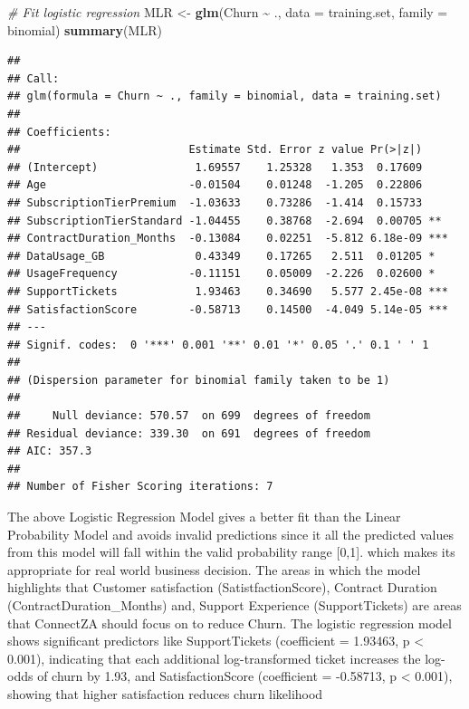 \documentclass[
]{article}
\newenvironment{Shaded}{\begin{snugshade}}{\end{snugshade}}
\newcommand{\AttributeTok}[1]{\textcolor[rgb]{0.13,0.29,0.53}{#1}}
\newcommand{\CommentTok}[1]{\textcolor[rgb]{0.56,0.35,0.01}{\textit{#1}}}
\newcommand{\FunctionTok}[1]{\textcolor[rgb]{0.13,0.29,0.53}{\textbf{#1}}}
\newcommand{\NormalTok}[1]{#1}
\newcommand{\OtherTok}[1]{\textcolor[rgb]{0.56,0.35,0.01}{#1}}
\newcommand{\SpecialCharTok}[1]{\textcolor[rgb]{0.81,0.36,0.00}{\textbf{#1}}}
\begin{document}
\begin{Shaded}
\begin{Highlighting}[]
\CommentTok{\# Fit logistic regression}
\NormalTok{MLR }\OtherTok{\textless{}{-}} \FunctionTok{glm}\NormalTok{(Churn }\SpecialCharTok{\textasciitilde{}}\NormalTok{ ., }\AttributeTok{data =}\NormalTok{ training.set, }\AttributeTok{family =}\NormalTok{ binomial)}
\FunctionTok{summary}\NormalTok{(MLR)}
\end{Highlighting}
\end{Shaded}

\begin{verbatim}
## 
## Call:
## glm(formula = Churn ~ ., family = binomial, data = training.set)
## 
## Coefficients:
##                          Estimate Std. Error z value Pr(>|z|)    
## (Intercept)               1.69557    1.25328   1.353  0.17609    
## Age                      -0.01504    0.01248  -1.205  0.22806    
## SubscriptionTierPremium  -1.03633    0.73286  -1.414  0.15733    
## SubscriptionTierStandard -1.04455    0.38768  -2.694  0.00705 ** 
## ContractDuration_Months  -0.13084    0.02251  -5.812 6.18e-09 ***
## DataUsage_GB              0.43349    0.17265   2.511  0.01205 *  
## UsageFrequency           -0.11151    0.05009  -2.226  0.02600 *  
## SupportTickets            1.93463    0.34690   5.577 2.45e-08 ***
## SatisfactionScore        -0.58713    0.14500  -4.049 5.14e-05 ***
## ---
## Signif. codes:  0 '***' 0.001 '**' 0.01 '*' 0.05 '.' 0.1 ' ' 1
## 
## (Dispersion parameter for binomial family taken to be 1)
## 
##     Null deviance: 570.57  on 699  degrees of freedom
## Residual deviance: 339.30  on 691  degrees of freedom
## AIC: 357.3
## 
## Number of Fisher Scoring iterations: 7
\end{verbatim}

\hfill\break
The above Logistic Regression Model gives a better fit than the Linear
Probability Model and avoids invalid predictions since it all the
predicted values from this model will fall within the valid probability
range {[}0,1{]}. which makes its appropriate for real world business
decision. The areas in which the model highlights that Customer
satisfaction (SatistfactionScore), Contract Duration
(ContractDuration\_Months) and, Support Experience (SupportTickets) are
areas that ConnectZA should focus on to reduce Churn. The logistic
regression model shows significant predictors like SupportTickets
(coefficient = 1.93463, p \textless{} 0.001), indicating that each
additional log-transformed ticket increases the log-odds of churn by
1.93, and SatisfactionScore (coefficient = -0.58713, p \textless{}
0.001), showing that higher satisfaction reduces churn likelihood\\
\end{document}
